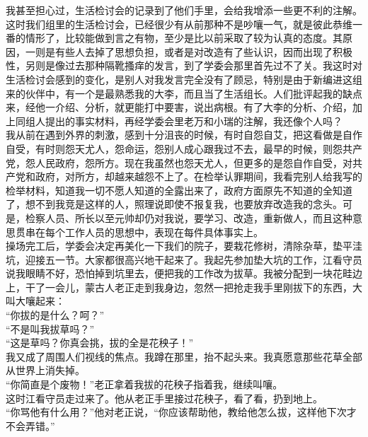 我甚至担心过，生活检讨会的记录到了他们手里，会给我增添一些更不利的注解。这时我们组里的生活检讨会，已经很少有从前那种不是吵嚷一气，就是彼此恭维一番的情形了，比较能做到言之有物，至少是比以前采取了较为认真的态度。其原因，一则是有些人去掉了思想负担，或者是对改造有了些认识，因而出现了积极性，另则是像过去那种隔靴搔痒的发言，到了学委会那里首先过不了关。我这时对生活检讨会感到的变化，是别人对我发言完全没有了顾忌，特别是由于新编进这组来的伙伴中，有一个是最熟悉我的大李，而且当了生活组长。人们批评起我的缺点来，经他一介绍、分析，就更能打中要害，说出病根。有了大李的分析、介绍，加上同组人提出的事实材料，再经学委会里老万和小瑞的注解，我还像个人吗？\\

我从前在遇到外界的刺激，感到十分沮丧的时候，有时自怨自艾，把这看做是自作自受，有时则怨天尤人，怨命运，怨别人成心跟我过不去，最早的时候，则怨共产党，怨人民政府，怨所方。现在我虽然也怨天尤人，但更多的是怨自作自受，对共产党和政府，对所方，却越来越怨不上了。在检举认罪期间，我看完别人给我写的检举材料，知道我一切不愿人知道的全露出来了，政府方面原先不知道的全知道了，想不到我竞是这样的人，照理说即使不报复我，也要放弃改造我的念头。可是，检察人员、所长以至元帅却仍对我说，要学习、改造，重新做人，而且这种意思贯串在每个工作人员的思想中，表现在每件具体事实上。\\

操场完工后，学委会决定再美化一下我们的院子，要栽花修树，清除杂草，垫平洼坑，迎接五一节。大家都很高兴地干起来了。我起先参加垫大坑的工作，江看守员说我眼睛不好，恐怕掉到坑里去，便把我的工作改为拔草。我被分配到一块花畦边上，干了一会儿，蒙古人老正走到我身边，忽然一把抢走我手里刚拔下的东西，大叫大嚷起来：\\

“你拔的是什么？呵？”\\

“不是叫我拔草吗？”\\

“这是草吗？你真会挑，拔的全是花秧子！”\\

我又成了周围人们视线的焦点。我蹲在那里，抬不起头来。我真愿意那些花草全部从世界上消失掉。\\

“你简直是个废物！”老正拿着我拔的花秧子指着我，继续叫嚷。\\

这时江看守员走过来了。他从老正手里接过花秧子，看了看，扔到地上。\\

“你骂他有什么用？”他对老正说，“你应该帮助他，教给他怎么拔，这样他下次才不会弄错。”\\

